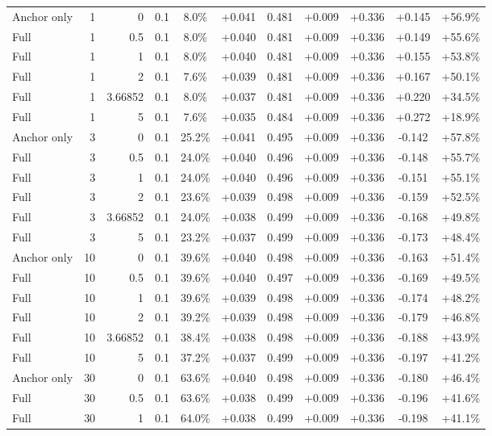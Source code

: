 \begin{table}[htbp]
\begin{tabular}{lrrrccccccc}
Anchor only & 1 & 0 & 0.1 & 8.0\% & +0.041 & 0.481 & +0.009 & +0.336 & +0.145 & +56.9\% \\
Full & 1 & 0.5 & 0.1 & 8.0\% & +0.040 & 0.481 & +0.009 & +0.336 & +0.149 & +55.6\% \\
Full & 1 & 1 & 0.1 & 8.0\% & +0.040 & 0.481 & +0.009 & +0.336 & +0.155 & +53.8\% \\
Full & 1 & 2 & 0.1 & 7.6\% & +0.039 & 0.481 & +0.009 & +0.336 & +0.167 & +50.1\% \\
Full & 1 & 3.66852 & 0.1 & 8.0\% & +0.037 & 0.481 & +0.009 & +0.336 & +0.220 & +34.5\% \\
Full & 1 & 5 & 0.1 & 7.6\% & +0.035 & 0.484 & +0.009 & +0.336 & +0.272 & +18.9\% \\
Anchor only & 3 & 0 & 0.1 & 25.2\% & +0.041 & 0.495 & +0.009 & +0.336 & -0.142 & +57.8\% \\
Full & 3 & 0.5 & 0.1 & 24.0\% & +0.040 & 0.496 & +0.009 & +0.336 & -0.148 & +55.7\% \\
Full & 3 & 1 & 0.1 & 24.0\% & +0.040 & 0.496 & +0.009 & +0.336 & -0.151 & +55.1\% \\
Full & 3 & 2 & 0.1 & 23.6\% & +0.039 & 0.498 & +0.009 & +0.336 & -0.159 & +52.5\% \\
Full & 3 & 3.66852 & 0.1 & 24.0\% & +0.038 & 0.499 & +0.009 & +0.336 & -0.168 & +49.8\% \\
Full & 3 & 5 & 0.1 & 23.2\% & +0.037 & 0.499 & +0.009 & +0.336 & -0.173 & +48.4\% \\
Anchor only & 10 & 0 & 0.1 & 39.6\% & +0.040 & 0.498 & +0.009 & +0.336 & -0.163 & +51.4\% \\
Full & 10 & 0.5 & 0.1 & 39.6\% & +0.040 & 0.497 & +0.009 & +0.336 & -0.169 & +49.5\% \\
Full & 10 & 1 & 0.1 & 39.6\% & +0.039 & 0.498 & +0.009 & +0.336 & -0.174 & +48.2\% \\
Full & 10 & 2 & 0.1 & 39.2\% & +0.039 & 0.498 & +0.009 & +0.336 & -0.179 & +46.8\% \\
Full & 10 & 3.66852 & 0.1 & 38.4\% & +0.038 & 0.498 & +0.009 & +0.336 & -0.188 & +43.9\% \\
Full & 10 & 5 & 0.1 & 37.2\% & +0.037 & 0.499 & +0.009 & +0.336 & -0.197 & +41.2\% \\
Anchor only & 30 & 0 & 0.1 & 63.6\% & +0.040 & 0.498 & +0.009 & +0.336 & -0.180 & +46.4\% \\
Full & 30 & 0.5 & 0.1 & 63.6\% & +0.038 & 0.499 & +0.009 & +0.336 & -0.196 & +41.6\% \\
Full & 30 & 1 & 0.1 & 64.0\% & +0.038 & 0.499 & +0.009 & +0.336 & -0.198 & +41.1\% \\

\end{tabular}
\end{table}
